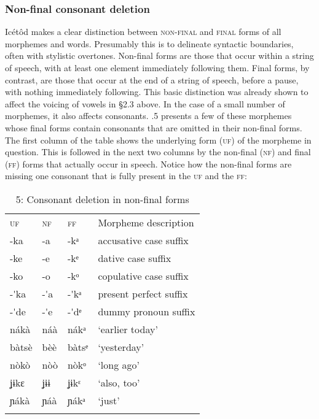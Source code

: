 \subsubsection{Non-final consonant deletion}

Icétôd makes a clear distinction between \textsc{non-final} and \textsc{final }forms of all morphemes and words. Presumably this is to delineate syntactic boundaries, often with stylistic overtones. Non-final forms are those that occur within a string of speech, with at least one element immediately following them. Final forms, by contrast, are those that occur at the end of a string of speech, before a pause, with nothing immediately following. This basic distinction was already shown to affect the voicing of vowels in §2.3 above. In the case of a small number of morphemes, it also affects consonants. .5 presents a few of these morphemes whose final forms contain consonants that are omitted in their non-final forms. The first column of the table shows the underlying form (\textsc{uf}) of the morpheme in question. This is followed in the next two columns by the non-final (\textsc{nf}) and final (\textsc{ff}) forms that actually occur in speech. Notice how the non-final forms are missing one consonant that is fully present in the \textsc{uf} and the \textsc{ff}:


\begin{table}
\caption{5: Consonant deletion in non-final forms}
\label{tab:2}


\begin{tabularx}{\textwidth}{XXXX}
\lsptoprule

\textsc{uf} & \textsc{nf} & \textsc{ff} & Morpheme description\\
{}-ka & {}-a & {}-kᵃ & accusative case suffix\\
{}-ke & {}-e & {}-kᵉ & dative case suffix\\
{}-ko & {}-o & {}-kᵒ & copulative case suffix\\
{}-\'{ }ka & {}-\'{ }a & {}-\'{ }kᵃ & present perfect suffix\\
{}-\'{ }de & {}-\'{ }e & {}-\'{ }dᵉ & dummy pronoun suffix\\
nákà & náà & nákᵃ & ‘earlier today’\\
bàtsè & bèè & bàtsᵉ & ‘yesterday’\\
nòkò & nòò & nòkᵒ & ‘long ago’\\
ʝɨkɛ & ʝɨɨ & ʝɨkᵋ & ‘also, too’\\
ɲákà & ɲáà & ɲákᵃ & ‘just’\\
\lspbottomrule
\end{tabularx}
\end{table}

